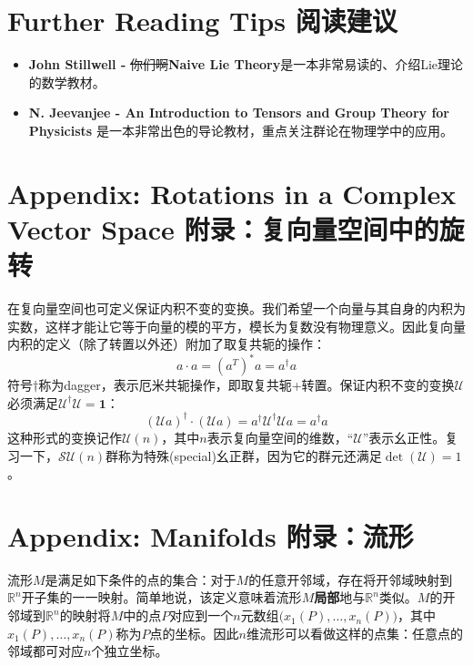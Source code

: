 \section*{Further Reading Tips \quad 阅读建议}
\begin{itemize}
    \item  {\bfseries John Stillwell -} \sout{你们啊}{\bfseries Naive Lie Theory}是一本非常易读的、介绍Lie理论的数学教材。
    \item {\bfseries N. Jeevanjee - An Introduction to Tensors and Group Theory for Physicists}
是一本非常出色的导论教材，重点关注群论在物理学中的应用。
\end{itemize}

\section[附录：复向量空间中的旋转]{Appendix: Rotations in a Complex Vector Space \quad 附录：复向量空间中的旋转}
\label{sec3.10}
在复向量空间也可定义保证内积不变的变换。我们希望一个向量与其自身的内积为实数，这样才能让它等于向量的模的平方，模长为复数没有物理意义。因此复向量内积的定义（除了转置以外还）附加了取复共轭的操作：
\begin{equation}
\label{sec3.260}
    a \cdot a = (a^T)^* a = a^\dag a
\end{equation}
符号$\dag$称为dagger，表示厄米共轭操作，即取复共轭+转置。保证内积不变的变换$\mathcal{U}$必须满足$\mathcal{U}^\dag \mathcal{U} = \mathbf{1}$：
\begin{equation}
\label{equ3.261}
    (\mathcal{U} a)^\dag \cdot (\mathcal{U} a) = a^\dag \mathcal{U}^\dag \mathcal{U} a = a^\dag a
\end{equation}
这种形式的变换记作$\mathcal{U} (n)$，其中$n$表示复向量空间的维数，“$\mathcal{U}$”表示幺正性。复习一下，$\mathcal{SU}(n)$群称为特殊(special)幺正群，因为它的群元还满足$\det (\mathcal{U}) = 1$。

\section[附录：流形]{Appendix: Manifolds \quad 附录：流形}
\label{sec3.11}
流形$M$是满足如下条件的点的集合：对于$M$的任意开邻域，存在将开邻域映射到$\mathbb{R}^n$开子集的一一映射。简单地说，该定义意味着流形$M${\bfseries 局部}地与$\mathbb{R}^n$类似。$M$的开邻域到$\mathbb{R}^n$的映射将$M$中的点$P$对应到一个$n$元数组$\big( x_1(P), \dots, x_n(P) \big)$，其中$x_1(P), \dots, x_n(P)$称为$P$点的坐标。因此$n$维流形可以看做这样的点集：任意点的邻域都可对应$n$个独立坐标。

